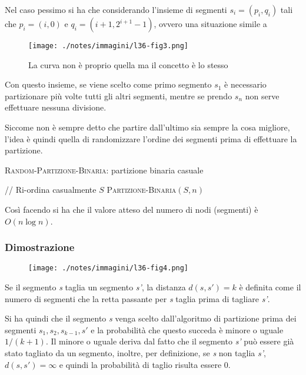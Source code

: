 Nel caso pessimo si ha che considerando l'insieme di segmenti $s_i = (p_i, q_i)$ tali che $p_i = (i,0)$ e $q_i = (i+1, 2^{i+1}-1)$, ovvero una situazione simile a

\begin{figure}[htbp]
\centering
\texttt{[image: ./notes/immagini/l36-fig3.png]}
\caption{La curva non è proprio quella ma il concetto è lo stesso}
\end{figure}

Con questo insieme, se viene scelto come primo segmento $s_1$ è necessario partizionare più volte tutti gli altri segmenti, mentre se
prendo $s_n$ non serve effettuare nessuna divisione.

Siccome non è sempre detto che partire dall'ultimo sia sempre la cosa migliore, l'idea è quindi quella di randomizzare l'ordine dei segmenti
prima di effettuare la partizione.

\begin{breakablealgorithm}
	\caption{\textsc{Random-Partizione-Binaria}: partizione binaria casuale}
	\begin{algorithmic}[1]
	    \State // Ri-ordina casualmente $S$
	    \State \Return \textsc{Partizione-Binaria}$(S,n)$
	\EndFunction
\end{algorithmic}
\end{breakablealgorithm}

Così facendo si ha che il valore atteso del numero di nodi (segmenti) è $O(n \log n)$.

\subsubsection{Dimostrazione}\label{dimostrazione}

\begin{figure}[htbp]
\centering
\texttt{[image: ./notes/immagini/l36-fig4.png]}
\end{figure}

Se il segmento \emph{s} taglia un segmento \emph{s'}, la distanza $d(s,s') = k$ è definita come il numero di segmenti che la retta
passante per \emph{s} taglia prima di tagliare \emph{s'}.

Si ha quindi che il segmento \emph{s} venga scelto dall'algoritmo di partizione prima dei segmenti $s_1, s_2, s_{k-1}, s'$ e la
probabilità che questo succeda è minore o uguale $1/(k+1)$. 
Il minore o uguale deriva dal fatto che il segmento \emph{s'} può essere già stato tagliato da un segmento, inoltre, per definizione, se \emph{s} non taglia \emph{s'}, $d(s,s') = \infty$ e quindi la probabilità di taglio risulta essere 0.

